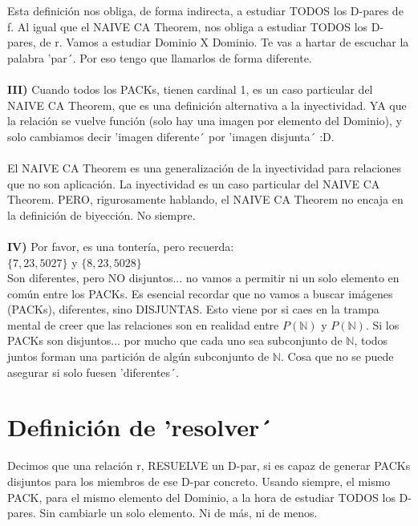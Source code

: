 	\noindent
	Esta definición nos obliga, de forma indirecta, a estudiar TODOS los D-pares de f. Al igual que el NAIVE CA Theorem, nos obliga a estudiar TODOS los D-pares, de r. Vamos a estudiar Dominio X Dominio. Te vas a hartar de escuchar la palabra 'par´. Por eso tengo que llamarlos de forma diferente.\\\\
	
	\noindent
	\textbf{III)} Cuando todos los PACKs, tienen cardinal 1, es un caso particular del NAIVE CA Theorem, que es una definición alternativa a la inyectividad. YA que la relación se vuelve función (solo hay una imagen por elemento del Dominio), y solo cambiamos decir 'imagen diferente´ por 'imagen disjunta´ :D.\\\\
	
	\noindent
	El NAIVE CA Theorem es una generalización de la inyectividad para relaciones que no son aplicación. La inyectividad es un caso particular del NAIVE CA Theorem. PERO, rigurosamente hablando, el NAIVE CA Theorem no encaja en la definición de biyección. No siempre.\\\\
	
	\noindent
	\textbf{IV)} Por favor, es una tontería, pero recuerda:\\
	$\{7, 23, 5027\}$ y $\{8, 23, 5028\}$\\
	Son diferentes, pero NO disjuntos... no vamos a permitir ni un solo elemento en común entre los PACKs. Es esencial recordar que no vamos a buscar imágenes (PACKs), diferentes, sino DISJUNTAS. Esto viene por si caes en la trampa mental de creer que las relaciones son en realidad entre $P(\mathbb{N})$ y $P(\mathbb{N})$. Si los PACKs son disjuntos... por mucho que cada uno sea subconjunto de $\mathbb{N}$, todos juntos forman una partición de algún subconjunto de $\mathbb{N}$. Cosa que no se puede asegurar si solo fuesen 'diferentes´. 
	
	
	\section{Definición de 'resolver´}
	
	\noindent
	Decimos que una relación r, RESUELVE un D-par, si es capaz de generar PACKs disjuntos para los miembros de ese D-par concreto. Usando siempre, el mismo PACK, para el mismo elemento del Dominio, a la hora de estudiar TODOS los D-pares. Sin cambiarle un solo elemento. Ni de más, ni de menos.
	\\\\
	
